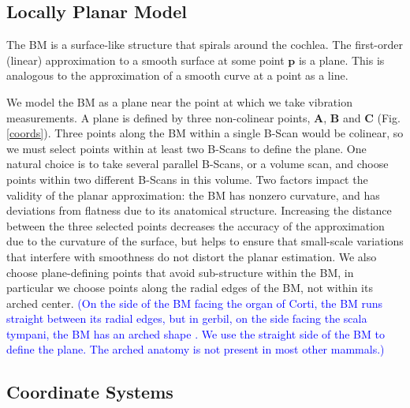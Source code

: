 \documentclass[preprint,NumberedRefs]{JASA}
\begin{document}
\subsection{Locally Planar Model}
\par{The BM is a surface-like structure that spirals around the cochlea. The first-order (linear) approximation to a smooth surface at some point $\mathbf{p}$ is a plane. This is analogous to the approximation of a smooth curve at a point as a line.} 
\par{We model the BM as a plane near the point at which we take vibration measurements. A plane is defined by three non-colinear points, $\mathbf{A}$, $\mathbf{B}$ and $\mathbf{C}$ (Fig. \ref{coords}). Three points along the BM within a single B-Scan would be colinear, so we must select points within at least two B-Scans to define the plane. One natural choice is to take several parallel B-Scans, or a volume scan, and choose points within two different B-Scans in this volume. Two factors impact the validity of the planar approximation: the BM has nonzero curvature, and has deviations from flatness due to its anatomical structure. Increasing the distance between the three selected points decreases the accuracy of the approximation due to the curvature of the surface, but helps to ensure that small-scale variations that interfere with smoothness do not distort the planar estimation. We also choose plane-defining points that avoid sub-structure within the BM, in particular we choose points along the radial edges of the BM, not within its arched center. \textcolor{blue}{(On the side of the BM facing the organ of Corti, the BM runs straight between its radial edges, but in gerbil, on the side facing the scala tympani, the BM has an arched shape \cite{kapuria}. We use the straight side of the BM to define the plane. The arched anatomy is not present in most other mammals.)}}

\subsection{Coordinate Systems}
\end{document}
